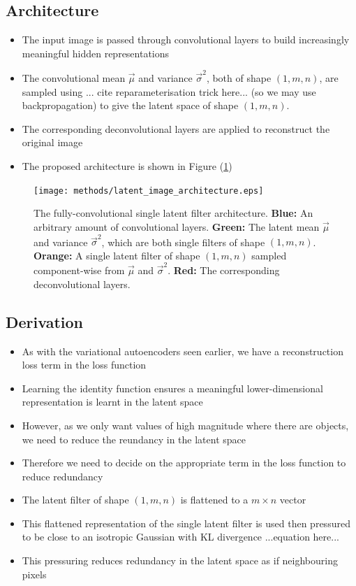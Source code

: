 \subsection{Architecture}
\begin{itemize}
\item The input image is passed through convolutional layers to build increasingly meaningful hidden representations
\item The convolutional mean $\vec{\mu}$ and variance $\vec{\sigma}^2$, both of shape $(1, m, n)$, are sampled using ... cite reparameterisation trick here... (so we may use backpropagation) to give the latent space of shape $(1, m, n)$. 
\item The corresponding deconvolutional layers are applied to reconstruct the original image
\item The proposed architecture is shown in Figure (\ref{fig:latent_image_architecture})
\end{itemize}

\begin{figure}[H]
\centering
\captionsetup{justification=centering}
\texttt{[image: methods/latent\_image\_architecture.eps]}
\caption{The fully-convolutional single latent filter architecture. \textbf{Blue:} An arbitrary amount of convolutional layers. \textbf{Green:} The latent mean $\vec{\mu}$ and variance $\vec{\sigma}^2$, which are both single filters of shape $(1, m, n)$. \textbf{Orange:} A single latent filter of shape $(1, m, n)$ sampled component-wise from $\vec{\mu}$ and $\vec{\sigma}^2$. \textbf{Red:} The corresponding deconvolutional layers.}
\label{fig:latent_image_architecture}
\end{figure}

%
%
\subsection{Derivation}
\begin{itemize}
\item As with the variational autoencoders seen earlier, we have a reconstruction loss term in the loss function
\item Learning the identity function ensures a meaningful lower-dimensional representation is learnt in the latent space
\item However, as we only want values of high magnitude where there are objects, we need to reduce the reundancy in the latent space
\item Therefore we need to decide on the appropriate term in the loss function to reduce redundancy
\item The latent filter of shape $(1, m, n)$ is flattened to a $m \times n$ vector
\item This flattened representation of the single latent filter is used then pressured to be close to an isotropic Gaussian with KL divergence ...equation here...
\item This pressuring reduces redundancy in the latent space as if neighbouring pixels 
\end{itemize}

